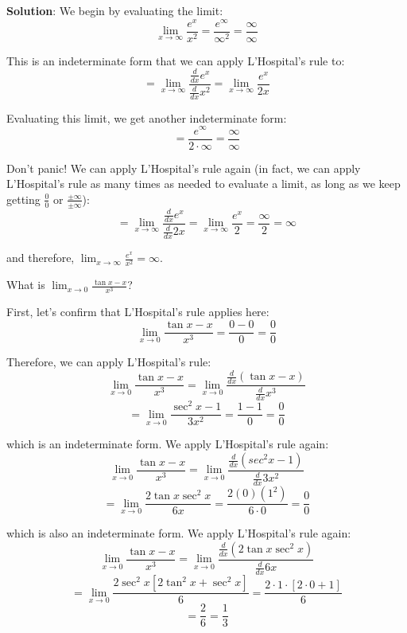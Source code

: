 \textbf{Solution}: We begin by evaluating the limit:
$$\lim_{x \to \infty} \frac{e^x}{x^2} = \frac{e^{\infty}}{\infty^2} = 
\frac{\infty}{\infty}$$

This is an indeterminate form that we can apply L'Hospital's rule to:
$$= \lim_{x \to \infty} \frac{\frac{d}{dx}e^x}{\frac{d}{dx}x^2} = \lim_{x \to 
\infty} \frac{e^x}{2x}$$

Evaluating this limit, we get another indeterminate form:
$$=\frac{e^{\infty}}{2 \cdot \infty} = \frac{\infty}{\infty}$$

Don't panic! We can apply L'Hospital's rule again (in fact, we can apply 
L'Hospital's rule as many times as needed to evaluate a limit, as long as we 
keep getting $\frac{0}{0}$ or $\frac{\pm \infty}{\pm \infty}$):
$$= \lim_{x \to \infty} \frac{\frac{d}{dx}e^x}{\frac{d}{dx}2x} = \lim_{x \to 
\infty} \frac{e^x}{2} = \frac{\infty}{2} = \infty$$

and therefore, $\lim_{x \to \infty} \frac{e^x}{x^2} = \infty$.

\begin{Exercise}[label=LH1]
What is $\lim_{x \to 0} \frac{\tan{x} - x}{x^3}$?
\end{Exercise}

\begin{Answer}[ref=LH1]
First, let's confirm that L'Hospital's rule applies here:
$$\lim_{x \to 0} \frac{\tan{x} - x}{x^3} = \frac{0 - 0}{0} = \frac{0}{0}$$

Therefore, we can apply L'Hospital's rule:
$$\lim_{x \to 0} \frac{\tan{x} - x}{x^3} = \lim_{x \to 0} \frac{\frac{d}{dx}(\tan{x} - x)}{\frac{d}{dx}x^3}$$
$$= \lim_{x \to 0} \frac{\sec^2{x} - 1}{3x^2} = \frac{1 - 1}{0} = \frac{0}{0}$$

which is an indeterminate form. We apply L'Hospital's rule again:
$$\lim_{x \to 0} \frac{\tan{x} - x}{x^3} = \lim_{x \to 0} \frac{\frac{d}{dx}(sec^2{x} - 1)}{\frac{d}{dx}3x^2}$$
$$= \lim_{x \to 0} \frac{2\tan{x}\sec^2{x}}{6x} = \frac{2(0)(1^2)}{6 \cdot 0} = \frac{0}{0}$$

which is also an indeterminate form. We apply L'Hospital's rule again:
$$\lim_{x \to 0} \frac{\tan{x} - x}{x^3} = \lim_{x \to 0} \frac{\frac{d}{dx}(2\tan{x}\sec^2{x})}{\frac{d}{dx}6x}$$
$$= \lim_{x \to 0} \frac{2\sec^2{x}[2\tan^2{x} + \sec^2{x}]}{6} = \frac{2 \cdot 1 \cdot [2 \cdot 0 + 1]}{6}$$
$$= \frac{2}{6} = \frac{1}{3}$$
\end{Answer}


